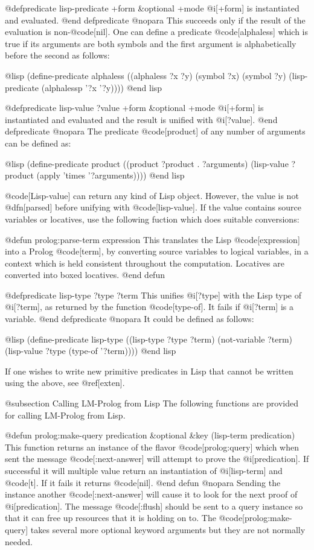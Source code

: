 {@defpredicate lisp-predicate +form &optional +mode
@i[+form] is instantiated and evaluated.
@end defpredicate
@nopara
This succeeds only if the result of the evaluation is non-@code[nil].
One can define a predicate @code[alphaless] which is true if its
arguments are both symbols and the first argument is alphabetically
before the second as follows:


@lisp
(define-predicate alphaless
  ((alphaless ?x ?y)
   (symbol ?x)
   (symbol ?y)
   (lisp-predicate (alphalessp '?x '?y))))
@end lisp

@defpredicate lisp-value ?value +form &optional +mode
@i[+form] is instantiated and evaluated and the result is unified with
@i[?value].
@end defpredicate
@nopara
The predicate @code[product] of any number of arguments can be defined as:

@lisp
(define-predicate product
  ((product ?product . ?arguments)
   (lisp-value ?product (apply 'times '?arguments))))
@end lisp

@code[Lisp-value] can return any kind of Lisp object.  However, the value
is not @dfn[parsed] before unifying with @code[lisp-value].  If the value
contains source variables or locatives, use the following fuction
which does suitable conversions:

@defun prolog:parse-term expression
This translates the Lisp @code[expression] into a Prolog @code[term], by
converting source variables to logical variables, in a context which is
held consistent throughout the computation.  Locatives are converted into
boxed locatives.
@end defun

@defpredicate lisp-type ?type ?term
This unifies @i[?type] with the Lisp type of @i[?term], as returned by the
function @code[type-of].
It fails if @i[?term] is a variable.
@end defpredicate
@nopara
It could be defined as follows:

@lisp
(define-predicate lisp-type
  ((lisp-type ?type ?term)
   (not-variable ?term)
   (lisp-value ?type (type-of '?term))))
@end lisp

If one wishes to write new primitive predicates in Lisp that cannot be written
using the above, see @ref[exten].

@subsection Calling LM-Prolog from Lisp
The following functions are provided for calling LM-Prolog from Lisp.

@defun prolog:make-query predication &optional &key (lisp-term predication)
This function returns an instance of the flavor @code[prolog:query] which when
sent the message @code[:next-answer] will attempt to prove the
@i[predication].
If successful it will multiple value return 
an instantiation of @i[lisp-term] and @code[t].
If it fails it returns @code[nil].
@end defun
@nopara
Sending the instance another @code[:next-answer] will cause it to look for the
next proof of @i[predication].
The message @code[:flush] should be sent to a query instance so that it can
free up resources that it is holding on to.
The @code[prolog:make-query] takes several more optional
keyword arguments but they are not normally needed.


}

